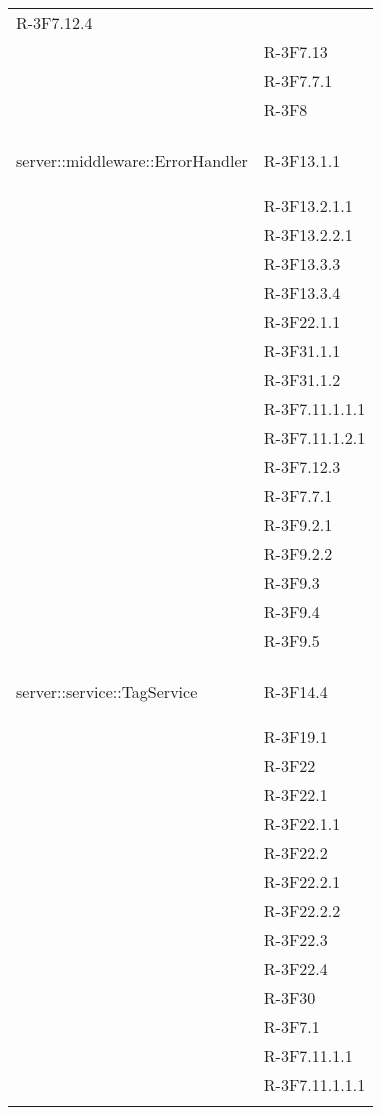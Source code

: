 \begin{longtable}{l p{3cm}}
	R-3F7.12.4 \tabularnewline &
	
	R-3F7.13 \tabularnewline &
	
	R-3F7.7.1 \tabularnewline &
	
	R-3F8 \tabularnewline &\tabularnewline
	\hline
	\hypertarget{server::middleware::ErrorHandler}{server::middleware::ErrorHandler} & R-3F13.1.1 \tabularnewline &
	
	R-3F13.2.1.1 \tabularnewline &
	
	R-3F13.2.2.1 \tabularnewline &
	
	R-3F13.3.3 \tabularnewline &
	
	R-3F13.3.4 \tabularnewline &
	
	R-3F22.1.1 \tabularnewline &
	
	R-3F31.1.1 \tabularnewline &
	
	R-3F31.1.2 \tabularnewline &
	
	R-3F7.11.1.1.1 \tabularnewline &
	
	R-3F7.11.1.2.1 \tabularnewline &
	
	R-3F7.12.3 \tabularnewline &
	
	R-3F7.7.1 \tabularnewline &
	
	R-3F9.2.1 \tabularnewline &
	
	R-3F9.2.2 \tabularnewline &
	
	R-3F9.3 \tabularnewline &
	
	R-3F9.4 \tabularnewline &
	
	R-3F9.5 \tabularnewline &\tabularnewline
	\hline
	\hypertarget{server::service::TagService}{server::service::TagService} & R-3F14.4 \tabularnewline &
	
	R-3F19.1 \tabularnewline &
	
	R-3F22 \tabularnewline &
	
	R-3F22.1 \tabularnewline &
	
	R-3F22.1.1 \tabularnewline &
	
	R-3F22.2 \tabularnewline &
	
	R-3F22.2.1 \tabularnewline &
	
	R-3F22.2.2 \tabularnewline &
	
	R-3F22.3 \tabularnewline &
	
	R-3F22.4 \tabularnewline &
	
	R-3F30 \tabularnewline &
	
	R-3F7.1 \tabularnewline &
	
	R-3F7.11.1.1 \tabularnewline &
	
	R-3F7.11.1.1.1 \tabularnewline &
	

\end{longtable}
